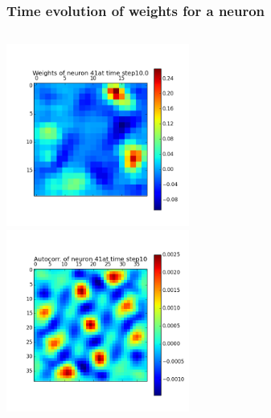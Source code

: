 \begin{frame}
\frametitle{Time evolution of weights for a neuron}
\begin{columns}[t]
\centering
\includegraphics[width=6cm,height=6cm]{neurons/neuron_w_41_t_10.png}\\
\centering
\includegraphics[width=6cm,height=6cm]{neurons/neuron_a_41_t_10.png}\\
\end{columns}
\end{frame}

